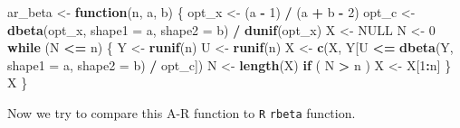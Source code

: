 \documentclass[]{book}
\newenvironment{Shaded}{\begin{snugshade}}{\end{snugshade}}
\newcommand{\ControlFlowTok}[1]{\textcolor[rgb]{0.13,0.29,0.53}{\textbf{#1}}}
\newcommand{\DataTypeTok}[1]{\textcolor[rgb]{0.13,0.29,0.53}{#1}}
\newcommand{\DecValTok}[1]{\textcolor[rgb]{0.00,0.00,0.81}{#1}}
\newcommand{\KeywordTok}[1]{\textcolor[rgb]{0.13,0.29,0.53}{\textbf{#1}}}
\newcommand{\NormalTok}[1]{#1}
\newcommand{\OperatorTok}[1]{\textcolor[rgb]{0.81,0.36,0.00}{\textbf{#1}}}
\newcommand{\OtherTok}[1]{\textcolor[rgb]{0.56,0.35,0.01}{#1}}
\newcommand{\StringTok}[1]{\textcolor[rgb]{0.31,0.60,0.02}{#1}}
\theoremstyle{definition}
\theoremstyle{definition}
\theoremstyle{definition}
\theoremstyle{remark}
\begin{document}
\begin{Shaded}
\begin{Highlighting}[]
\NormalTok{ar_beta <-}\StringTok{ }\ControlFlowTok{function}\NormalTok{(n, a, b) \{}
\NormalTok{  opt_x <-}\StringTok{ }\NormalTok{(a }\OperatorTok{-}\StringTok{ }\DecValTok{1}\NormalTok{) }\OperatorTok{/}\StringTok{ }\NormalTok{(a }\OperatorTok{+}\StringTok{ }\NormalTok{b }\OperatorTok{-}\StringTok{ }\DecValTok{2}\NormalTok{)}
\NormalTok{  opt_c <-}\StringTok{ }\KeywordTok{dbeta}\NormalTok{(opt_x, }\DataTypeTok{shape1 =}\NormalTok{ a, }\DataTypeTok{shape2 =}\NormalTok{ b) }\OperatorTok{/}\StringTok{ }\KeywordTok{dunif}\NormalTok{(opt_x)}
\NormalTok{  X <-}\StringTok{ }\OtherTok{NULL}
\NormalTok{  N <-}\StringTok{ }\DecValTok{0}
  \ControlFlowTok{while}\NormalTok{ (N }\OperatorTok{<=}\StringTok{ }\NormalTok{n) \{}
\NormalTok{    Y <-}\StringTok{ }\KeywordTok{runif}\NormalTok{(n)}
\NormalTok{    U <-}\StringTok{ }\KeywordTok{runif}\NormalTok{(n)}
\NormalTok{    X <-}\StringTok{ }\KeywordTok{c}\NormalTok{(X, Y[U }\OperatorTok{<=}\StringTok{ }\KeywordTok{dbeta}\NormalTok{(Y, }\DataTypeTok{shape1 =}\NormalTok{ a, }\DataTypeTok{shape2 =}\NormalTok{ b) }\OperatorTok{/}\StringTok{ }\NormalTok{opt_c])}
\NormalTok{    N <-}\StringTok{ }\KeywordTok{length}\NormalTok{(X)}
    \ControlFlowTok{if}\NormalTok{ ( N }\OperatorTok{>}\StringTok{ }\NormalTok{n ) X <-}\StringTok{ }\NormalTok{X[}\DecValTok{1}\OperatorTok{:}\NormalTok{n]}
\NormalTok{  \}}
\NormalTok{  X}
\NormalTok{\}}
\end{Highlighting}
\end{Shaded}

Now we try to compare this A-R function to \texttt{R} \texttt{rbeta} function.

\begin{Shaded}
\end{Shaded}
\end{document}
